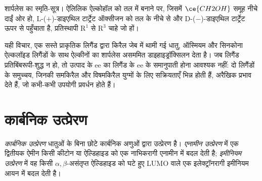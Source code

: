 \begin{omfigure}

{\small शार्पलेस का स्मृति-सूत्र। ऐलिलिक ऐल्कोहॉल को तल में बनाने पर, जिसमें
$\ce{CH2OH}$ समूह नीचे दाईं ओर हो, L-($+$)-डाइएथिल टार्ट्रेट ऑक्सीजन को
तल के नीचे से और D-($-$)-डाइएथिल टार्ट्रेट ऊपर से पहुँचाता है,
प्रतिस्थापी $\mathrm R^1$ से $\mathrm R^3$ चाहे जो हों।}
\end{omfigure}

यही विचार, एक सस्ते प्राकृतिक लिगैंड द्वारा किरैल जेब में थामी गई धातु, ऑस्मियम और सिनकोना
ऐल्कलॉइड लिगैंडों के साथ ऐल्कीनों का शार्पलेस असममित डाइहाइड्रॉक्सिलन देता है।
जब लिगैंड प्रतिबिंबरूपी-शुद्ध न हो, तो उत्पाद के ee का लिगैंड के ee के
समानुपाती होना आवश्यक नहीं: दो लिगैंडों के समुच्चय, जिनकी
समकिरैल और विषमकिरैल युग्मों के लिए सक्रियताएँ भिन्न होती हैं, अरैखिक
प्रभाव देते हैं, जो कभी-कभी उपयोगी प्रवर्धन होते हैं।

\section{कार्बनिक उत्प्रेरण}

\begin{definition}[कार्बनिक उत्प्रेरण]\label{def:b3:asymmetric-synthesis:organocatalysis}
\emph{कार्बनिक उत्प्रेरण} धातुओं के बिना छोटे कार्बनिक
अणुओं द्वारा उत्प्रेरण है। \emph{एनामीन उत्प्रेरण} में
एक द्वितीयक ऐमीन किसी कीटोन या ऐल्डिहाइड को एक नाभिकरागी एनामीन में बदल देती है;
\emph{इमीनियम उत्प्रेरण} में वह किसी $\alpha,\beta$-असंतृप्त
ऐल्डिहाइड को घटे हुए LUMO वाले एक इलेक्ट्रॉनरागी इमीनियम आयन में बदल देती है।
\end{definition}

